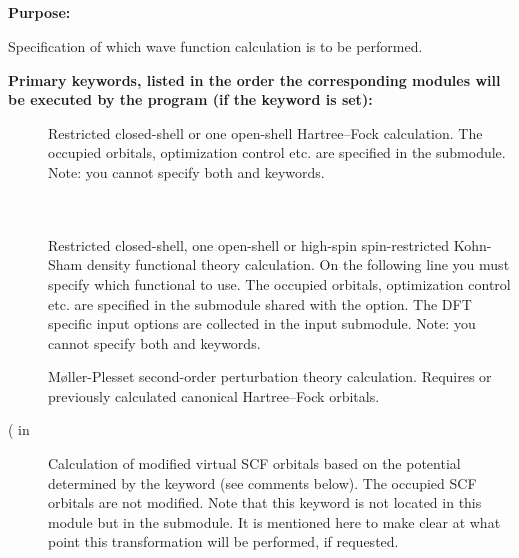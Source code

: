 \pagebreak[3]
\subsection{\label{ref-geninp}}

{\bf Purpose:}

Specification of which wave function calculation is to be performed.

{\bf Primary keywords, listed in the order the corresponding modules
 will be executed by the program (if the keyword is set): }

\begin{description}

\item[]
  Restricted closed-shell or one open-shell 
  Hartree--Fock calculation.
  The occupied orbitals, optimization control etc. are specified in the
   submodule.
  Note: you cannot specify both  and  keywords.


\item[] \ \\
   \\
  Restricted closed-shell, one
  open-shell or high-spin spin-restricted Kohn-Sham density functional
  theory
  calculation.  On the following line you must specify which
  functional to use.  The occupied orbitals, optimization control
  etc. are specified in the  submodule shared with
  the  option.  The DFT specific input options are
  collected in the  input submodule.
  Note: you cannot specify both  and  keywords.

\item[]
  M{\o}ller-Plesset second-order perturbation theory calculation.
  Requires  or previously calculated canonical Hartree--Fock orbitals.

\item[( in ]
  Calculation of modified virtual SCF orbitals based on the
  potential determined by the keyword (see comments below).
  The occupied SCF orbitals are not modified.
  Note that this keyword is not located in this module but in the
   submodule. It is mentioned here to make clear
  at what point this transformation will be performed, if requested.


\end{description}
